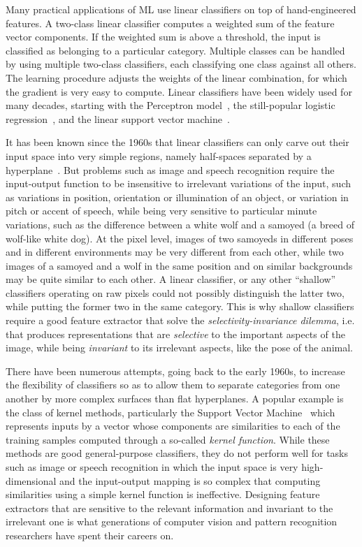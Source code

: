 \documentclass[10pts]{article}
\begin{document}
Many practical applications of ML use linear classifiers on top of
hand-engineered features. A two-class linear classifier computes a
weighted sum of the feature vector components. If the weighted sum is
above a threshold, the input is classified as belonging to a
particular category. Multiple classes can be handled by using multiple
two-class classifiers, each classifying one class against all
others. The learning procedure adjusts the weights of the linear
combination, for which the gradient is very easy to compute. Linear
classifiers have been widely used for many decades, starting with the
Perceptron model~\citep{Rosenblatt57}, the still-popular logistic
regression~\cite{Hastie2001}, and the linear support vector
machine~\cite{Boser92}. 

It has been known since the 1960s that linear classifiers can only
carve out their input space into very simple regions, namely
half-spaces separated by a hyperplane~\citep{Duda-Hart}.  But problems
such as image and speech recognition require the input-output function
to be insensitive to irrelevant variations of the input, such as
variations in position, orientation or illumination of an object, or
variation in pitch or accent of speech, while being very sensitive to
particular minute variations, such as the difference between a white
wolf and a samoyed (a breed of wolf-like white dog).  At the pixel
level, images of two samoyeds in different poses and in different
environments may be very different from each other, while two images
of a samoyed and a wolf in the same position and on similar
backgrounds may be quite similar to each other. A linear classifier,
or any other ``shallow'' classifiers operating on raw pixels could not
possibly distinguish the latter two, while putting the former two in
the same category. This is why shallow classifiers require a good
feature extractor that solve the {\em selectivity-invariance dilemma},
i.e. that produces representations that are {\em selective} to the
important aspects of the image, while being {\em invariant} to its
irrelevant aspects, like the pose of the animal.

There have been numerous attempts, going back to the early 1960s, to
increase the flexibility of classifiers so as to allow them to
separate categories from one another by more complex surfaces than
flat hyperplanes. A popular example is the class of kernel methods,
particularly the Support Vector Machine~\citep{Boser92} which
represents inputs by a vector whose components are similarities to
each of the training samples computed through a so-called {\em kernel
  function}. While these methods are good general-purpose classifiers,
they do not perform well for tasks such as image or speech recognition
in which the input space is very high-dimensional and the input-output
mapping is so complex that computing similarities using a simple
kernel function is ineffective. Designing feature extractors that are
sensitive to the relevant information and invariant to the irrelevant
one is what generations of computer vision and pattern recognition
researchers have spent their careers on.
\end{document}
